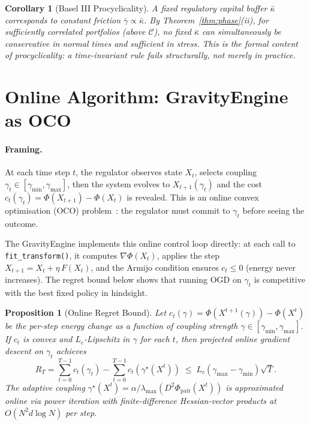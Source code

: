 \documentclass[11pt]{article}
\newtheorem{proposition}[theorem]{Proposition}
\newtheorem{corollary}[theorem]{Corollary}
\theoremstyle{definition}
\newcommand{\grad}{\nabla}
\newcommand{\Cman}{\mathcal{C}}
\newcommand{\lmax}{\lambda_{\max}}
\begin{document}
\begin{corollary}[Basel III Procyclicality]
\label{cor:procyclical}
A fixed regulatory capital buffer $\bar\kappa$ corresponds to constant friction
$\bar\gamma \propto \bar\kappa$.  By Theorem~\ref{thm:phase}(ii), for sufficiently
correlated portfolios (above $\Cman$), no fixed $\bar\kappa$ can simultaneously
be conservative in normal times and sufficient in stress.  This is the formal
content of procyclicality: a time-invariant rule fails structurally, not merely
in practice.
\end{corollary}

\section{Online Algorithm: GravityEngine as OCO}
\label{sec:online}

\paragraph{Framing.}
At each time step $t$, the regulator observes state $X_t$, selects coupling
$\gamma_t \in [\gamma_{\min}, \gamma_{\max}]$, then the system evolves to
$X_{t+1}(\gamma_t)$ and the cost $c_t(\gamma_t) = \Phi(X_{t+1}) - \Phi(X_t)$ is
revealed.  This is an online convex optimisation (OCO) problem~\citep{hazan2016oco}:
the regulator must commit to $\gamma_t$ before seeing the outcome.

The GravityEngine implements this online control loop directly: at each call to
\texttt{fit\_transform()}, it computes $\grad\Phi(X_t)$, applies the
step $X_{t+1} = X_t + \eta\,F(X_t)$, and the Armijo condition ensures
$c_t \le 0$ (energy never increases).  The regret bound below shows that running
OGD on $\gamma_t$ is competitive with the best fixed policy in hindsight.

\begin{proposition}[Online Regret Bound]
\label{prop:cs1}
Let $c_t(\gamma) = \Phi(X^{t+1}(\gamma)) - \Phi(X^t)$ be the per-step energy
change as a function of coupling strength $\gamma \in [\gamma_{\min},\gamma_{\max}]$.
If $c_t$ is convex and $L_c$-Lipschitz in $\gamma$ for each $t$, then projected
online gradient descent on $\gamma_t$ achieves
\[
  R_T = \sum_{t=0}^{T-1}c_t(\gamma_t) - \sum_{t=0}^{T-1}c_t(\gamma^\star(X^t))
  \;\le\; L_c(\gamma_{\max}-\gamma_{\min})\sqrt{T}.
\]
The adaptive coupling $\gamma^\star(X^t) = \alpha/\lmax(D^2\Phi_{\mathrm{pair}}(X^t))$
is approximated online via power iteration with finite-difference Hessian-vector
products at $O(N^2 d \log N)$ per step.
\end{proposition}
\end{document}
